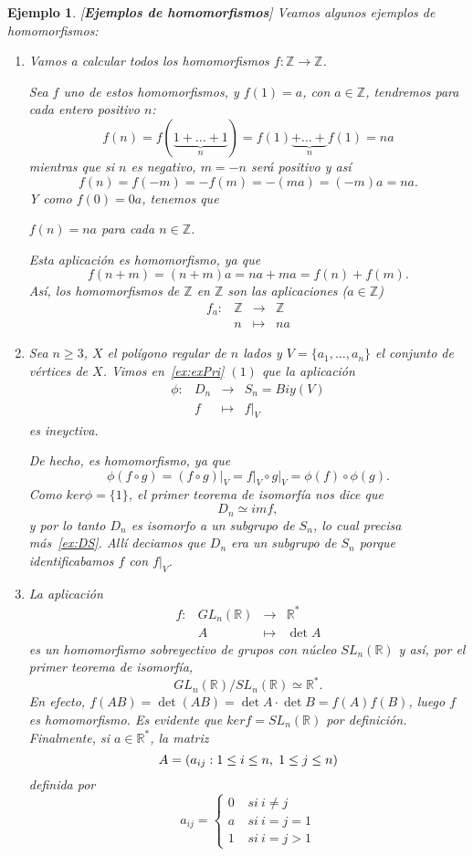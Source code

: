 \documentclass[12pt]{article}
\newtheorem{example}{Ejemplo}[theorem]
\begin{document}
\begin{example}\label{ex:homs} [\textbf{\textit{Ejemplos de homomorfismos}}]
Veamos algunos ejemplos de homomorfismos: 
\begin{enumerate}
\item Vamos a calcular todos los homomorfismos $f\colon \mathbb{Z} \longrightarrow  \mathbb{Z}$.

Sea $f$ uno de estos homomorfismos, y $f(1) = a$, con $a\in \mathbb{Z}$, tendremos para cada entero positivo $n$: $$f(n) = f(\underbrace{1+\ldots+1}_n) = f(1)\underbrace{ + \ldots + }_n f(1) = na$$
mientras que si $n$ es negativo, $m = -n$ será positivo y así $$f(n) = f(-m) = -f(m) = -(ma) = (-m)a = na.$$
Y como $f(0) = 0a$, tenemos que
\begin{center}
$f(n) = na$ para cada $n\in \mathbb{Z}$.
\end{center}
Esta aplicación es homomorfismo, ya que $$f(n+m) = (n+m)a = na + ma = f(n) + f(m).$$
Así, los homomorfismos de $\mathbb{Z}$ en $\mathbb{Z}$ son las aplicaciones ($a\in \mathbb{Z}$) $$\begin{array}{rccl}
f_{a}\colon &\mathbb{Z} & \longrightarrow & \mathbb{Z}\\
&n& \longmapsto &na
\end{array}
$$
\item Sea $n \geq 3$, $X$ el polígono regular de $n$ lados y $V = \lbrace a_1, \ldots, a_n \rbrace$ el conjunto de vértices de $X$. Vimos en~\ref{ex:exPri} $(1)$ que la aplicación $$\begin{array}{rccl}
\phi\colon &D_n& \longrightarrow &S_n = Biy(V)\\
&f& \longmapsto &f\big|_V
\end{array}
$$ es ineyctiva.

De hecho, es homomorfismo, ya que $$\phi(f \circ g) = (f \circ g)\big|_V = f\big|_V \circ g\big|_V = \phi(f) \circ \phi(g).$$ Como $ker \phi = \lbrace 1 \rbrace$, el primer teorema de isomorfía nos dice que $$D_n \simeq im f,$$ y por lo tanto $D_n$ es isomorfo a un subgrupo de $S_n$, lo cual precisa más~\ref{ex:DS}. Allí deciamos que $D_n$ era un subgrupo de $S_n$ porque identificabamos $f$ con $f\big|_V$.
\item La aplicación $$\begin{array}{rccl}
f\colon &GL_{n}(\mathbb{R}) & \longrightarrow & \mathbb{R}^{\ast}\\
&A& \longmapsto &\det A
\end{array}
$$ es un homomorfismo sobreyectivo de grupos con núcleo $SL_{n}(\mathbb{R})$ y así, por el primer teorema de isomorfía, $$GL_{n}(\mathbb{R})/SL_{n}(\mathbb{R}) \simeq \mathbb{R}^{\ast}.$$
En efecto, $f(AB) = \det(AB) = \det A \cdot \det B = f(A)f(B)$, luego $f$ es homomorfismo. Es evidente que $ker f = SL_{n}(\mathbb{R})$ por definición. Finalmente, si $a \in \mathbb{R}^{\ast}$, la matriz $$A = (a_{ij} : 1 \leq i \leq n,\hspace{0.1cm} 1\leq j \leq n)$$ definida por $$a_{ij} = \left\lbrace \begin{array}{ll} 0&~si~i\neq j\\ a&~si~i=j=1\\1&~si~i=j>1  \end{array}\right.$$ 


\end{enumerate}
\end{example}
\end{document}

